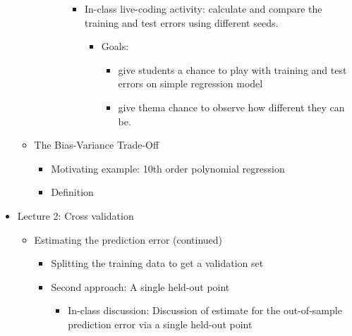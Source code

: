 \documentclass[
  letterpaper,
  DIV=11,
  numbers=noendperiod]{scrartcl}
\providecommand{\tightlist}{%
  \setlength{\itemsep}{0pt}\setlength{\parskip}{0pt}}\usepackage{longtable,booktabs,array}
\begin{document}
\begin{itemize}
\begin{itemize}
\begin{itemize}
\begin{itemize}
        \begin{itemize}
        \tightlist
        \item
          In-class live-coding activity: calculate and compare the
          training and test errors using different seeds.

          \begin{itemize}
          \tightlist
          \item
            Goals:

            \begin{itemize}
            \tightlist
            \item
              give students a chance to play with training and test
              errors on simple regression model
            \item
              give thema chance to observe how different they can be.
            \end{itemize}
          \end{itemize}
        \end{itemize}
      \end{itemize}
    \end{itemize}
  \item
    The Bias-Variance Trade-Off

    \begin{itemize}
    \tightlist
    \item
      Motivating example: 10th order polynomial regression
    \item
      Definition
    \end{itemize}
  \end{itemize}
\item
  Lecture 2: Cross validation

  \begin{itemize}
  \tightlist
  \item
    Estimating the prediction error (continued)

    \begin{itemize}
    \tightlist
    \item
      Splitting the training data to get a validation set
    \item
      Second approach: A single held-out point

      \begin{itemize}
      \tightlist
      \item
        In-class discussion: Discussion of estimate for the
        out-of-sample prediction error via a single held-out point


\end{itemize}
\end{itemize}
\end{itemize}
\end{itemize}
\end{document}
